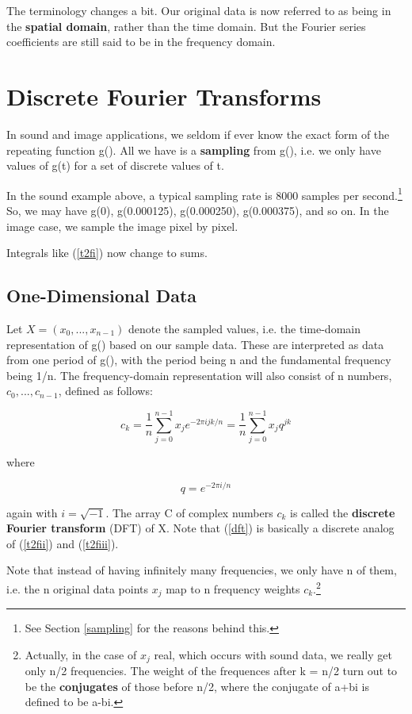 The terminology changes a bit.  Our original data is now referred to as
being in the {\bf spatial domain}, rather than the time domain. But the
Fourier series coefficients are still said to be in the frequency
domain.

\section{Discrete Fourier Transforms} 
\label{1dim}

In sound and image applications, we seldom if ever know the exact form
of the repeating function g().  All we have is a {\bf sampling} from
g(), i.e. we only have values of g(t) for a set of discrete values of t.

In the sound example above, a typical sampling rate is 8000 samples per
second.\footnote{See Section \ref{sampling} for the reasons behind
this.} So, we may have g(0), g(0.000125), g(0.000250), g(0.000375), and
so on.  In the image case, we sample the image pixel by pixel.

Integrals like (\ref{t2fi}) now change to sums.  

\subsection{One-Dimensional Data}
\label{onedimdft}

Let $X = (x_0,...,x_{n-1})$ denote the sampled values, i.e. the
time-domain representation of g() based on our sample data.  These are
interpreted as data from one period of g(), with the period being n and
the fundamental frequency being 1/n.  The frequency-domain
representation will also consist of n numbers, $c_0,...,c_{n-1}$,
defined as follows:

\begin{equation}
\label{dft}
c_k = 
\frac{1}{n} \sum_{j=0}^{n-1} x_j e^{-2\pi i jk/n} =
\frac{1}{n} \sum_{j=0}^{n-1} x_j q^{jk}
\end{equation}

where

\begin{equation}
q = e^{-2\pi i /n}
\end{equation}

again with $i = \sqrt{-1}$.  The array C of complex numbers $c_k$ is
called the {\bf discrete Fourier transform} (DFT) of X.
Note that (\ref{dft}) is basically a discrete analog of 
(\ref{t2fii}) and (\ref{t2fiii}).

Note that instead of having infinitely many frequencies, we only have n
of them, i.e. the n original data points $x_j$ map to n frequency weights
$c_k$.\footnote{Actually, in the case of $x_j$ real, which occurs with
sound data, we really get only n/2 frequencies.  The weight of the
frequences after k = n/2 turn out to be the {\bf conjugates} of those
before n/2, where the conjugate of a+bi is defined to be a-bi.}

